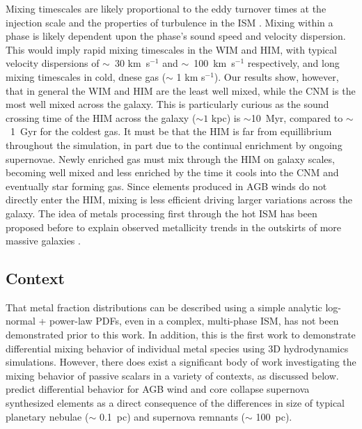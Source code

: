 \documentclass[twocolumn]{aastex61}
\begin{document}
%
%
Mixing timescales are likely proportional to the eddy turnover times at the injection scale \citep{PanScannapieco2010, Colbrook2017} and the properties of turbulence in the ISM \citep{YangKrumholz2012}. Mixing within a phase is likely dependent upon the phase's sound speed and velocity dispersion. This would imply rapid mixing timescales in the WIM and HIM, with typical velocity dispersions of $\sim$~30 km~s$^{-1}$ and $\sim$~100~km~s$^{-1}$ respectively, and long mixing timescales in cold, dnese gas ($\sim$ 1 km s$^{-1}$). Our results show, however, that in general the WIM and HIM are the least well mixed, while the CNM is the most well mixed across the galaxy. This is particularly curious as the sound crossing time of the HIM across the galaxy ($\sim 1$ kpc) is $\sim$10~Myr, compared to $\sim$~1~Gyr for the coldest gas. It must be that the HIM is far from equillibrium throughout the simulation, in part due to the continual enrichment by ongoing supernovae. Newly enriched gas must mix through the HIM on galaxy scales, becoming well mixed and less enriched by the time it cools into the CNM and eventually star forming gas. Since elements produced in AGB winds do not directly enter the HIM, mixing is less efficient driving larger variations across the galaxy. The idea of metals processing first through the hot ISM has been proposed before to explain observed metallicity trends in the outskirts of more massive galaxies \citep{Tassis2008,Werk2011}. 

\subsection{Context}
\label{sec:context}
That metal fraction distributions can be described using a simple analytic log-normal + power-law PDFs, even in a complex, multi-phase ISM, has not been demonstrated prior to this work.   In addition, this is the first work to demonstrate differential mixing behavior of individual metal species using 3D hydrodynamics simulations. However, there does exist a significant body of work investigating the mixing behavior of passive scalars in a variety of contexts, as discussed below. \cite{KrumholzTing2018} predict differential behavior for AGB wind and core collapse supernova synthesized elements as a direct consequence of the differences in size of typical planetary nebulae ($\sim$ 0.1~pc) and supernova remnants ($\sim$ 100~pc). 
\end{document}

